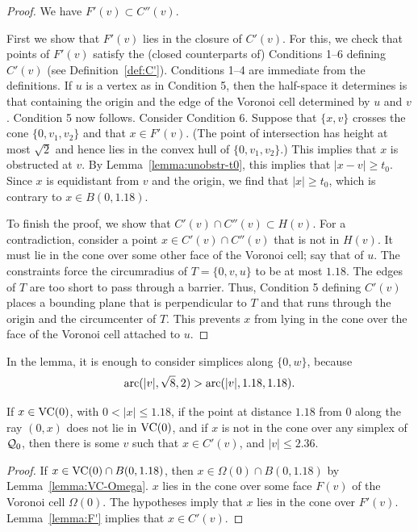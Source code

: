 \begin{proof} We have $F'(v)\subset C''(v)$.

First we show that $F'(v)$ lies in the closure of $C'(v)$.  For
this, we check that points of $F'(v)$ satisfy the (closed
counterparts of) Conditions 1--6 defining $C'(v)$
(see Definition~\ref{def:C'}). Conditions 1--4
are immediate from the definitions.  If $u$ is a vertex as in
Condition 5, then the half-space it determines is that containing
the origin and the edge of the Voronoi cell determined by $u$ and
$v$.  Condition 5 now follows.  Consider Condition 6.  Suppose
that $\{x,v\}$ crosses the cone $\{0,v_1,v_2\}$ and that $x\in
F'(v)$.
(The point of intersection has height  at most $\sqrt2$ and
hence lies in the convex hull of $\{0,v_1,v_2\}$.)
This implies that $x$ is obstructed at $v$.  By
Lemma~\ref{lemma:unobstr-t0}, this implies that $|x-v|\ge t_0$.
Since $x$ is equidistant from $v$ and the origin, we find that
$|x|\ge t_0$, which is contrary to $x\in B(0,1.18)$.

To finish the proof, we show that $C'(v)\cap C''(v)\subset H(v)$.
For a contradiction, consider a point $x\in C'(v)\cap C''(v)$ that is
not in $H(v)$.  It must lie in the cone over some other face of
the Voronoi cell; say that of $u$. The constraints force the
circumradius of $T=\{0,v,u\}$ to be at most $1.18$.  The edges of
$T$ are too short to pass through a barrier.  Thus, Condition 5
defining $C'(v)$ places a bounding plane that is perpendicular to
$T$ and that runs through the origin and the circumcenter of $T$.
This prevents $x$ from lying in the cone over the face of the
Voronoi cell attached to $u$.
\end{proof}

\begin{remark} In the lemma,
it is enough to consider simplices along $\{0,w\}$, because
$$
  \operatorname{arc}(|v|,\sqrt8,2) > \operatorname{arc}(|v|,1.18,1.18).
$$
\end{remark}

\begin{corollary}\label{lemma:all-in-C'}
If $x\in {\operatorname{VC}}(0)$, with $0< |x|\le1.18$,  if the point at distance
$1.18$ from $0$ along the ray $(0,x)$ does not lie in
${\operatorname{VC}}(0)$, and if $x$ is not in the cone over any simplex of
${\mathcal Q}_0$, then there is some $v$ such that $x\in C'(v)$, and
$|v|\le 2.36$.
\end{corollary}

\begin{proof} If $x\in {\operatorname{VC}}(0)\cap B(0,1.18)$,
then $x\in \Omega(0)\cap B(0,1.18)$ by Lemma~\ref{lemma:VC-Omega}.
$x$ lies in the cone over some face $F(v)$ of the Voronoi cell
$\Omega(0)$. The hypotheses imply that $x$ lies in the cone over
$F'(v)$. Lemma~\ref{lemma:F'} implies that $x\in C'(v)$.
\end{proof}

